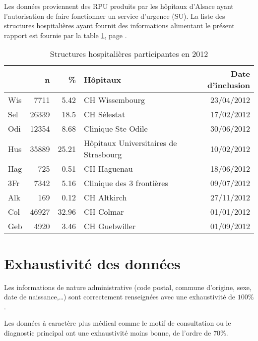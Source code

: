 \documentclass[12pt,english,french]{report}
\begin{document}
Les données proviennent des RPU produits par les hôpitaux d'Alsace ayant l'autorisation de faire fonctionner un service d'urgence (SU). La liste des structures hospitalières ayant fournit des informations alimentant le présent rapport est fournie par la table \ref{tab1}, page \pageref{tab1}.

\begin{table}[ht]
\centering
\begin{tabular}{|l|r|r|l|r|}
  \hline
 & n & \% & Hôpitaux & Date d'inclusion \\ 
  \hline
Wis & 7711 & 5.42 & CH Wissembourg & 23/04/2012 \\ 
  Sel & 26339 & 18.5 & CH Sélestat & 17/02/2012 \\ 
  Odi & 12354 & 8.68 & Clinique Ste Odile & 30/06/2012 \\ 
  Hus & 35889 & 25.21 & Hôpitaux Universitaires de Strasbourg & 10/02/2012 \\ 
  Hag & 725 & 0.51 & CH Haguenau & 18/06/2012 \\ 
  3Fr & 7342 & 5.16 & Clinique des 3 frontières & 09/07/2012 \\ 
  Alk & 169 & 0.12 & CH Altkirch & 27/11/2012 \\ 
  Col & 46927 & 32.96 & CH Colmar & 01/01/2012 \\ 
  Geb & 4920 & 3.46 & CH Guebwiller & 01/09/2012 \\ 
   \hline
\end{tabular}
\caption{Structures hospitalières participantes en 2012} 
\label{tab1}
\end{table}
\section{Exhaustivité des données}

Les informations de nature administrative (code postal, commune d'origine, sexe, date de naissance,\dots ) sont correctement renseignées avec une exhaustivité de $100\%$.

Les données à caractère plus médical comme le motif de consultation ou le diagnostic principal ont une exhaustivité moins bonne, de l'ordre de $70\%$.
\end{document}
